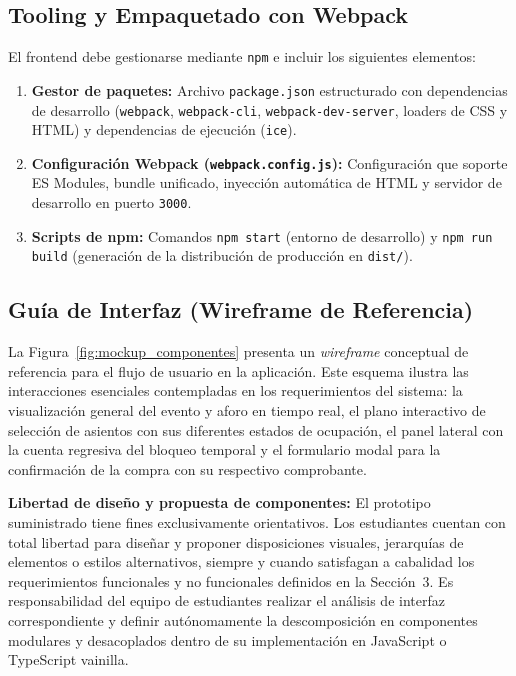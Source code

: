 \documentclass[10pt,letterpaper]{article}
\begin{document}
\subsection{Tooling y Empaquetado con Webpack}
El frontend debe gestionarse mediante \texttt{npm} e incluir los siguientes elementos:
\begin{enumerate}[leftmargin=*]
  \item \textbf{Gestor de paquetes:} Archivo \texttt{package.json} estructurado con dependencias de desarrollo (\texttt{webpack}, \texttt{webpack-cli}, \texttt{webpack-\allowbreak dev-\allowbreak server}, loaders de CSS y HTML) y dependencias de ejecución (\texttt{ice}).
  \item \textbf{Configuración Webpack (\texttt{webpack.config.js}):} Configuración que soporte ES Modules, bundle unificado, inyección automática de HTML y servidor de desarrollo en puerto \texttt{3000}.
  \item \textbf{Scripts de npm:} Comandos \texttt{npm start} (entorno de desarrollo) y \texttt{npm run build} (generación de la distribución de producción en \texttt{dist/}).
\end{enumerate}

\subsection{Guía de Interfaz (Wireframe de Referencia)}
La Figura~\ref{fig:mockup_componentes} presenta un \textit{wireframe} conceptual de referencia para el flujo de usuario en la aplicación. Este esquema ilustra las interacciones esenciales contempladas en los requerimientos del sistema: la visualización general del evento y aforo en tiempo real, el plano interactivo de selección de asientos con sus diferentes estados de ocupación, el panel lateral con la cuenta regresiva del bloqueo temporal y el formulario modal para la confirmación de la compra con su respectivo comprobante.

\vspace{4pt}
\noindent\textbf{Libertad de diseño y propuesta de componentes:} El prototipo suministrado tiene fines exclusivamente orientativos. Los estudiantes cuentan con total libertad para diseñar y proponer disposiciones visuales, jerarquías de elementos o estilos alternativos, siempre y cuando satisfagan a cabalidad los requerimientos funcionales y no funcionales definidos en la Sección~3. Es responsabilidad del equipo de estudiantes realizar el análisis de interfaz correspondiente y definir autónomamente la descomposición en componentes modulares y desacoplados dentro de su implementación en JavaScript o TypeScript vainilla.
\end{document}
